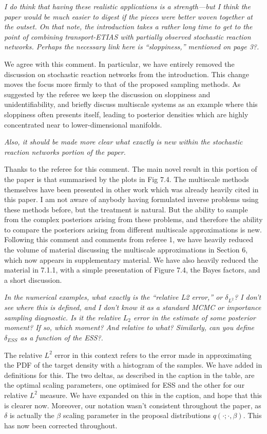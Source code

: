 \documentclass{article}
\newcommand{\comment}[2]{\vspace{0.6cm}{\bf Comment:} {\it #1.}

\vspace{0.3cm}{\bf Answer:} #2}
\begin{document}
\comment{I do think that having these realistic applications is a strength—but I think the paper would be much easier to digest if the pieces were better woven together at the outset. On that note, the introduction takes a rather long time to get to the point of combining transport-ETIAS with partially observed stochastic reaction networks. Perhaps the necessary link here is “sloppiness,” mentioned on page 3?}{We agree with this comment. In particular, we have entirely removed the discussion on stochastic reaction networks from the introduction. This change moves the focus more firmly to that of the proposed sampling methods. As suggested by the referee we keep the discussion on sloppiness and unidentifiability, and briefly discuss multiscale systems as an example where this sloppiness often presents itself, leading to posterior densities which are highly concentrated near to lower-dimensional manifolds.}



\comment{Also, it should be made more clear what exactly is new within the stochastic reaction networks portion of the paper}{Thanks to the referee for this comment. The main novel result in this portion of the paper is that summarised by the plots in Fig 7.4. The multiscale methods themselves have been presented in other work which was already heavily cited in this paper. I am not aware of anybody having formulated inverse problems using these methods before, but the treatment is natural. But the ability to sample from the complex posteriors arising from these problems, and therefore the ability to compare the posteriors arising from different multiscale approximations is new. Following this comment and comments from referee 1, we have heavily reduced the volume of material discussing the multiscale approximations in Section 6, which now appears in supplementary material. We have also heavily reduced the material in 7.1.1, with a simple presentation of Figure 7.4, the Bayes factors, and a short discussion.}


\comment{In the numerical examples, what exactly is the “relative L2 error,” or $\delta_{L^2}$? I don’t see where this is defined, and I don’t know it as a standard MCMC or importance sampling diagnostic. Is it the relative $L_2$ error in the estimate of some posterior moment? If so, which moment? And relative to what? Similarly, can you define $\delta_{ESS}$ as a function of the ESS?}{The relative $L^2$ error in this context refers to the error made in approximating the PDF of the target density with a histogram of the samples. We have added in definitions for this. The two deltas, as described in the caption in the table, are the optimal scaling parameters, one optimised for ESS and the other for our relative $L^2$ measure. We have expanded on this in the caption, and hope that this is clearer now. Moreover, our notation wasn't consistent throughout the paper, as $\delta$ is actually the $\beta$ scaling parameter in the proposal distributions $q(\cdot;\cdot,\beta)$. This has now been corrected throughout.}
\end{document}
